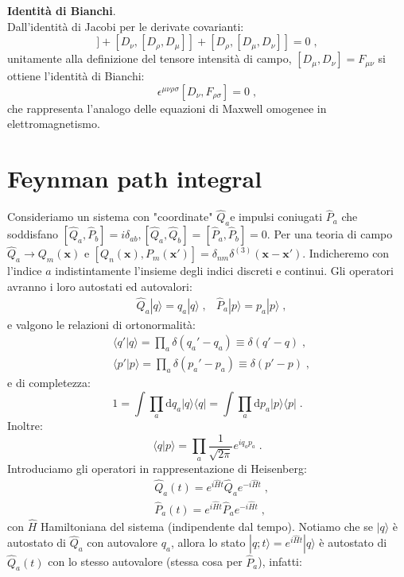 \documentclass[12pt,a4paper]{article}
\theoremstyle{definition}
\newcommand{\diff}[1][]{\mathrm{d}#1}
\newcommand{\bra}{\langle}
\newcommand{\ket}{\rangle}
\numberwithin{equation}{section}
\begin{document}
\textbf{Identità di Bianchi}. \\
Dall'identità di Jacobi per le derivate covarianti:
\begin{equation}
[D_{\mu},[D_{\nu},D_{\rho}]]+[D_{\nu},[D_{\rho},D_{\mu}]]+[D_{\rho},[D_{\mu},D_{\nu}]]=0\;,
\end{equation}
unitamente alla definizione del tensore intensità di campo, $[D_{\mu},D_{\nu}]=F_{\mu\nu}$ si ottiene l'identità di Bianchi:
\begin{equation}
\epsilon^{\mu\nu\rho\sigma}[D_{\nu},F_{\rho\sigma}]=0\;,
\end{equation}
che rappresenta l'analogo delle equazioni di Maxwell omogenee in elettromagnetismo.
\cleardoublepage
\section{Feynman path integral}
Consideriamo un sistema con "coordinate" $\hat{Q}_a$e impulsi coniugati $\hat{P}_a$ che soddisfano $[\hat{Q}_a,\hat{P}_b]=i\delta_{ab},[\hat{Q}_a,\hat{Q}_b]=[\hat{P}_a,\hat{P}_b]=0$. Per una teoria di campo $\hat{Q}_a\to Q_m(\mathbf{x})$ e $[Q_n(\mathbf{x}),P_m(\mathbf{x}')]=\delta_{nm}\delta^{(3)}(\mathbf{x}-\mathbf{x}')$. Indicheremo con l'indice $a$ indistintamente l'insieme degli indici discreti e continui. Gli operatori avranno i loro autostati ed autovalori:
\begin{align}
&\hat{Q}_a|q\ket=q_a|q\ket\;, &\hat{P}_a|p\ket=p_a|p\ket\;,
\end{align}
e valgono le relazioni di ortonormalità:
\begin{align}
&\bra q'|q\ket=\prod_a\delta(q_a'-q_a)\equiv \delta(q'-q)\;, \\
&\bra p'|p\ket=\prod_a\delta(p_a'-p_a)\equiv \delta(p'-p)\;,
\end{align}
e di completezza:
\begin{equation}
1=\int\prod_a\diff{q}_a|q\ket\bra q|=\int\prod_a\diff{p}_a|p\ket\bra p|\;.
\end{equation}
Inoltre:
\begin{equation}
\bra q|p\ket=\prod_a\frac{1}{\sqrt{2\pi}}e^{iq_ap_a}\;.
\end{equation}
Introduciamo gli operatori in rappresentazione di Heisenberg:
\begin{align}
&\hat{Q}_a(t)=e^{i\hat{H}t}\hat{Q}_ae^{-i\hat{H}t}\;, \\
&\hat{P}_a(t)=e^{i\hat{H}t}\hat{P}_ae^{-i\hat{H}t}\;,
\end{align}
con $\hat{H}$ Hamiltoniana del sistema (indipendente dal tempo). Notiamo che se $|q\ket$ è autostato di $\hat{Q}_a$ con autovalore $q_a$, allora lo stato $|q;t\ket=e^{i\hat{H}t}|q\ket$ è autostato di $\hat{Q}_a(t)$ con lo stesso autovalore (stessa cosa per $\hat{P}_a$), infatti:
\end{document}
